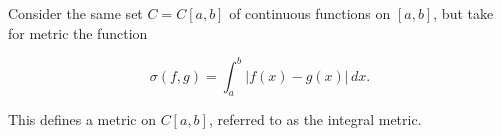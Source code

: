 Consider the same set $C = C[a,b]$ of continuous functions on $[a,b]$, but take for metric the function

$$\sigma(f, g) = \int_a^b |f(x) - g(x)| \, dx.$$

This defines a metric on $C[a,b]$, referred to as the integral metric.
